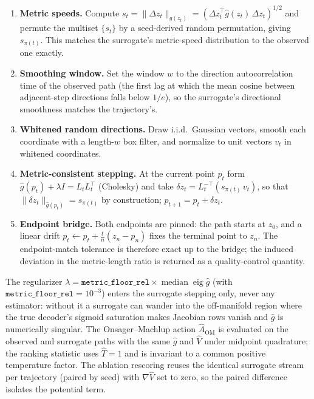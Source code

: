 \documentclass{article}
\begin{document}
\begin{enumerate}
\item \textbf{Metric speeds.} Compute $s_t = \lVert\Delta z_t\rVert_{\hat
g(z_t)} = (\Delta z_t^{\top}\hat g(z_t)\,\Delta z_t)^{1/2}$ and permute the
multiset $\{s_t\}$ by a seed-derived random permutation, giving $s_{\pi(t)}$. This
matches the surrogate's metric-speed distribution to the observed one exactly.
\item \textbf{Smoothing window.} Set the window $w$ to the direction
autocorrelation time of the observed path (the first lag at which the mean cosine
between adjacent-step directions falls below $1/e$), so the surrogate's
directional smoothness matches the trajectory's.
\item \textbf{Whitened random directions.} Draw i.i.d.\ Gaussian vectors, smooth
each coordinate with a length-$w$ box filter, and normalize to unit vectors
$v_t$ in whitened coordinates.
\item \textbf{Metric-consistent stepping.} At the current point $p_t$ form
$\hat g(p_t)+\lambda I = L_tL_t^{\top}$ (Cholesky) and take $\delta z_t =
L_t^{-\top}(s_{\pi(t)}\,v_t)$, so that $\lVert\delta z_t\rVert_{\hat g(p_t)} =
s_{\pi(t)}$ by construction; $p_{t+1}=p_t+\delta z_t$.
\item \textbf{Endpoint bridge.} Both endpoints are pinned: the path starts at
$z_0$, and a linear drift $p_t \leftarrow p_t + \tfrac{t}{n}(z_n - p_n)$ fixes the
terminal point to $z_n$. The endpoint-match tolerance is therefore exact up to the
bridge; the induced deviation in the metric-length ratio is returned as a
quality-control quantity.
\end{enumerate}

The regularizer $\lambda = \texttt{metric\_floor\_rel}\times\operatorname{median}
\operatorname{eig}\hat g$ (with $\texttt{metric\_floor\_rel}=10^{-3}$) enters the
surrogate stepping only, never any estimator: without it a surrogate can wander
into the off-manifold region where the true decoder's sigmoid saturation makes
Jacobian rows vanish and $\hat g$ is numerically singular. The Onsager--Machlup
action $\hat A_{\mathrm{OM}}$ is evaluated on the observed and surrogate paths with
the same $\hat g$ and $\hat V$ under midpoint quadrature; the ranking statistic
uses $\hat T=1$ and is invariant to a common positive temperature factor. The
ablation rescoring reuses the identical surrogate stream per trajectory (paired by
seed) with $\nabla\hat V$ set to zero, so the paired difference isolates the
potential term.
\end{document}
